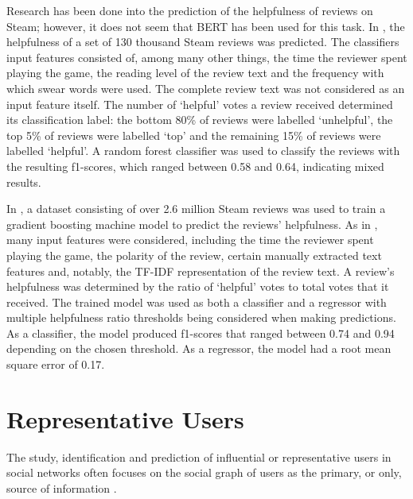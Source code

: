 Research has been done into the prediction of the helpfulness of reviews on Steam; however, it does not seem that BERT has been used for this task. In \cite{eberhard2018investigating}, the helpfulness of a set of 130 thousand Steam reviews was predicted. The classifiers input features consisted of, among many other things, the time the reviewer spent playing the game, the reading level of the review text and the frequency with which swear words were used. The complete review text was not considered as an input feature itself. The number of `helpful' votes a review received determined its classification label: the bottom 80\% of reviews were labelled `unhelpful', the top 5\% of reviews were labelled `top' and the remaining 15\% of reviews were labelled `helpful'. A random forest classifier was used to classify the reviews with the resulting f1-scores, which ranged between 0.58 and 0.64, indicating mixed results.

In \cite{baowaly2019predicting}, a dataset consisting of over 2.6 million Steam reviews was used to train a gradient boosting machine model to predict the reviews' helpfulness. As in \cite{eberhard2018investigating}, many input features were considered, including the time the reviewer spent playing the game, the polarity of the review, certain manually extracted text features and, notably, the TF-IDF representation of the review text. A review's helpfulness was determined by the ratio of `helpful' votes to total votes that it received. The trained model was used as both a classifier and a regressor with multiple helpfulness ratio thresholds being considered when making predictions. As a classifier, the model produced f1-scores that ranged between 0.74 and 0.94 depending on the chosen threshold. As a regressor, the model had a root mean square error of 0.17.

\section{Representative Users} \label{sec:LR_Rep}

The study, identification and prediction of influential or representative users in social networks often focuses on the social graph of users as the primary, or only, source of information \cite{trusov2010determining} \cite{ghosh2010predicting}.

